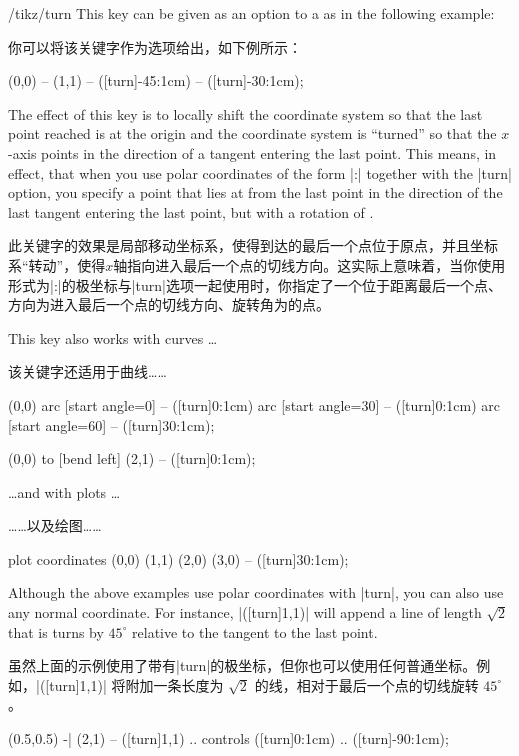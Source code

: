 \begin{key}{/tikz/turn}
    This key can be given as an option to a  as in the
    following example:
    
    你可以将该关键字作为选项给出，如下例所示：%
\begin{codeexample}[]
\tikz \draw (0,0) -- (1,1) -- ([turn]-45:1cm) -- ([turn]-30:1cm);
\end{codeexample}
    The effect of this key is to locally shift the coordinate system so that
    the last point reached is at the origin and the coordinate system is
    ``turned'' so that the $x$-axis points in the direction of a tangent
    entering the last point. This means, in effect, that when you use polar
    coordinates of the form |:| together
    with the |turn| option, you specify a point that lies at 
    from the last point in the direction of the last tangent entering the last
    point, but with a rotation of .

    此关键字的效果是局部移动坐标系，使得到达的最后一个点位于原点，并且坐标系“转动”，使得$x$轴指向进入最后一个点的切线方向。这实际上意味着，当你使用形式为|:|的极坐标与|turn|选项一起使用时，你指定了一个位于距离最后一个点、方向为进入最后一个点的切线方向、旋转角为的点。


    This key also works with curves \dots

    该关键字还适用于曲线……

\begin{codeexample}[]
\tikz [delta angle=30, radius=1cm]
  \draw (0,0) arc [start angle=0]  -- ([turn]0:1cm)
              arc [start angle=30] -- ([turn]0:1cm)
              arc [start angle=60] -- ([turn]30:1cm);
\end{codeexample}
\begin{codeexample}[]
\tikz \draw (0,0) to [bend left] (2,1) -- ([turn]0:1cm);
\end{codeexample}
    \dots and with plots \dots

    ……以及绘图……
\begin{codeexample}[]
\tikz \draw plot coordinates {(0,0) (1,1) (2,0) (3,0) } -- ([turn]30:1cm);
\end{codeexample}

    Although the above examples use polar coordinates with |turn|, you can also
    use any normal coordinate. For instance, |([turn]1,1)| will append a line
    of length $\sqrt 2$ that is turns by $45^\circ$ relative to the tangent to
    the last point.

    虽然上面的示例使用了带有|turn|的极坐标，但你也可以使用任何普通坐标。例如，|([turn]1,1)| 将附加一条长度为 $\sqrt 2$ 的线，相对于最后一个点的切线旋转 $45^\circ$。
\begin{codeexample}[]
\tikz \draw (0.5,0.5) -| (2,1) -- ([turn]1,1)
         .. controls ([turn]0:1cm) .. ([turn]-90:1cm);
\end{codeexample}
\end{key}


